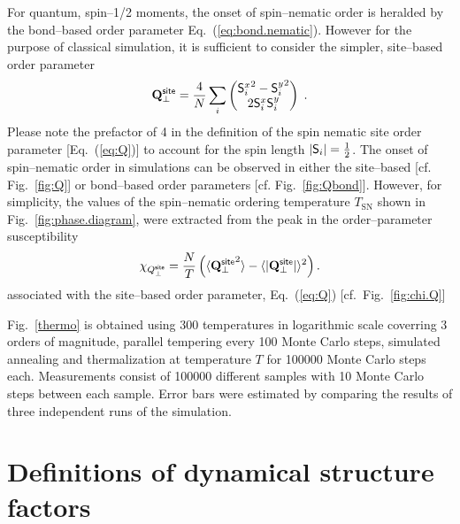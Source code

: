 \documentclass[apsrev4-1,prx,superscriptaddress,floatfix,twocolumn,longbibliography]{revtex4-1}
\begin{document}
\begin{appendix}

For quantum, spin--1/2 moments, the onset of spin--nematic order is 
heralded by the bond--based order parameter Eq.~(\ref{eq:bond.nematic}).
%
However for the purpose of classical simulation, it is sufficient to consider 
the simpler, site--based order parameter
%
 \begin{eqnarray}
   {\bf Q}_\perp^{\sf site} = 
\frac{4}{N} \sum_i \begin{pmatrix}
   {\mathsf{S}^x_i}^2 -{\mathsf{S}^y_i}^2 \\
    2 \mathsf{S}^x_i \mathsf{S}^y_i
    \end{pmatrix}  \; .
 \label{eq:Q}
 \end{eqnarray}
%
Please note the prefactor 
of 4 in the definition of the spin nematic site order parameter 
[Eq.~(\ref{eq:Q})] to account for the spin length $|{\sf S}_i|=\frac{1}{2}$.  
%
The onset of spin--nematic order in simulations can be observed in either 
the site--based [cf. Fig.~\ref{fig:Q}] or bond--based order parameters 
[cf. Fig.~\ref{fig:Qbond}].
%
However, for simplicity, the values of the spin--nematic ordering 
temperature $T_\text{SN}$ shown in Fig.~\ref{fig:phase.diagram}, were 
extracted from the peak in the order--parameter susceptibility 
%
\begin{equation}
  \label{eq:chiQ}
  \chi_{Q_{\perp}^{\sf site}} 
  = \frac{N}{T} \left( \langle {{\bf Q}^{\sf site} _\perp}^2 \rangle 
  - \langle| {\bf Q}^{\sf site}_\perp |\rangle^2 \right).
\end{equation}
%
associated with the site--based order parameter, Eq.~(\ref{eq:Q}) [cf.~Fig.~\ref{fig:chi.Q}]%


Fig.~\ref{thermo} is obtained using 300 temperatures in logarithmic
scale coverring 3 orders of magnitude, parallel tempering every 100
Monte Carlo steps, simulated annealing and thermalization at
temperature $T$ for 100000 Monte Carlo steps each. Measurements
consist of 100000 different samples with 10 Monte Carlo steps between
each sample. 
%
Error bars were estimated by comparing the results of three independent
runs of the simulation.

\section{Definitions of dynamical structure factors}
\label{app:Sq}


\end{appendix}
\end{document}
